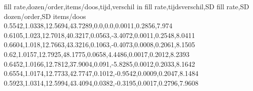 fill rate,dozen/order,items/doos,tijd,verschil in fill rate,tijdsverschil,SD fill rate,SD dozen/order,SD items/doos
0.5542,1.0338,12.5694,43.7289,0.0,0.0,0.0011,0.2856,7.974
0.6105,1.023,12.7018,40.3217,0.0563,-3.4072,0.0011,0.2548,8.0411
0.6604,1.018,12.7663,43.3216,0.1063,-0.4073,0.0008,0.2061,8.1505
0.62,1.0157,12.7925,48.1775,0.0658,4.4486,0.0017,0.2012,8.2393
0.6452,1.0166,12.7812,37.9004,0.091,-5.8285,0.0012,0.2033,8.1642
0.6554,1.0174,12.7733,42.7747,0.1012,-0.9542,0.0009,0.2047,8.1484
0.5923,1.0314,12.5994,43.4094,0.0382,-0.3195,0.0017,0.2796,7.9608
